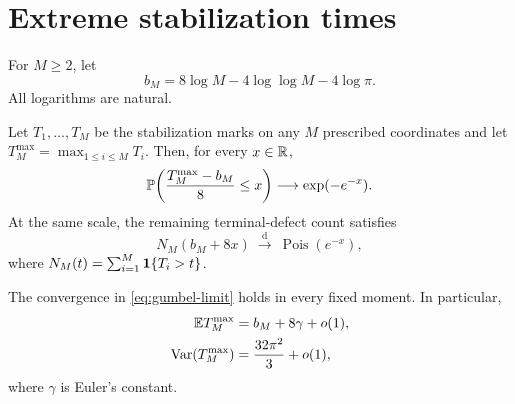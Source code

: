 \section{Extreme stabilization times}

For $M\ge2$, let
\begin{equation}\label{eq:bM}
  b_M=8\log M-4\log\log M-4\log\pi.
\end{equation}
All logarithms are natural.

\begin{theorem}\label{thm:gumbel}
Let $T_1,\dots,T_M$ be the stabilization marks on any $M$ prescribed
coordinates and let $T_M^{\max}=\max_{1\le i\le M}T_i$.  Then, for every
$x\in\R$,
\begin{equation}\label{eq:gumbel-limit}
  \P\!\left(\frac{T_M^{\max}-b_M}{8}\le x\right)
  \longrightarrow \exp(-e^{-x}).
\end{equation}
At the same scale, the remaining terminal-defect count satisfies
\begin{equation}\label{eq:poisson-defect-limit}
  N_M(b_M+8x)
  \ \xrightarrow{\mathrm d}\
  \operatorname{Pois}(e^{-x}),
\end{equation}
where $N_M(t)=\sum_{i=1}^M\1\{T_i>t\}$.

The convergence in \eqref{eq:gumbel-limit} holds in every fixed moment.  In
particular,
\begin{align}
  \E T_M^{\max}
  &=b_M+8\gamma+o(1),\label{eq:mean-max}\\
  \Var(T_M^{\max})
  &=\frac{32\pi^2}{3}+o(1),
  \label{eq:variance-max}
\end{align}
where $\gamma$ is Euler's constant.
\end{theorem}

